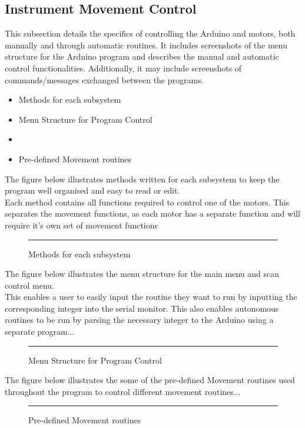 \documentclass{UoNMCHA}
\numberwithin{equation}{section}
\begin{document}
\subsection{Instrument Movement Control}\label{sub:Instrument Movement Control}
This subsection details the specifics of controlling the Arduino and motors, both manually and through automatic routines. It includes screenshots of the menu structure for the Arduino program and describes the manual and automatic control functionalities. Additionally, it may include screenshots of commands/messages exchanged between the programs.	\\
\begin{itemize}
	\item Methods for each subsystem
	\item Menu Structure for Program Control
	\item 
	\item Pre-defined Movement routines
\end{itemize}
The figure below illustrates methods written for each subsystem to keep the program well organised and easy to read or edit.\\
Each method contains all functions required to control one of the motors. This separates the movement functions, as each motor has a separate function and will require it's own set of movement functions
\begin{figure}[h]
	\centering
	\rule{0.5\textwidth}{0.5\textwidth}%
	\caption{Methods for each subsystem}
	\label{fig:Methods for each subsystem}
\end{figure}
The figure below illustrates the menu structure for the main menu and scan control menu.\\
This enables a user to easily input the routine they want to run by inputting the corresponding integer into the serial monitor. This also enables autonomous routines to be run by parsing the necessary integer to the Arduino using a separate program... \\
\begin{figure}[h]
	\centering
	\rule{0.5\textwidth}{0.5\textwidth}%
	\caption{Menu Structure for Program Control}
	\label{fig:Menu Structure for Program Control}
\end{figure}
The figure below illustrates the some of the pre-defined Movement routines used throughout the program to control different movement routines...\\
\begin{figure}[h]
	\centering
	\rule{0.5\textwidth}{0.5\textwidth}%
	\caption{Pre-defined Movement routines}
	\label{fig:Pre-defined Movement routines}
\end{figure}
\end{document}
